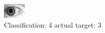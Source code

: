 \begin{figure}[h!]
\begin{center}
\includegraphics[width=0.60\columnwidth]{figures/ID288_class_4_target_3.png}
\end{center}
\caption{ Classification: 4 actual target: 3}
\label{fig:ID288_class_4_target_3}
\end{figure}
